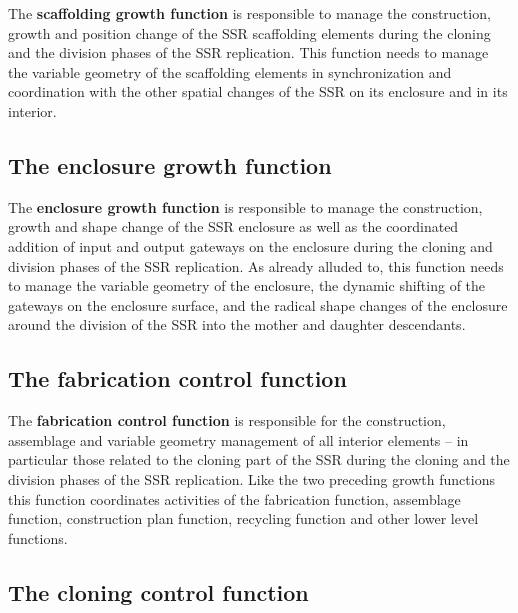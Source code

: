 \hypertarget{RefHeading3094306210128}{}The \textbf{scaffolding growth
function} is responsible to manage the construction, growth and
position change of the SSR scaffolding elements during the cloning and
the division phases of the SSR replication. This function needs to
manage the variable geometry of the scaffolding elements in
synchronization and coordination with the other spatial changes of the
SSR on its enclosure and in its interior.

\subsection[The enclosure growth function]{The enclosure growth
function}

\hypertarget{RefHeading3096306210128}{}The \textbf{enclosure growth
function} is responsible to manage the construction, growth and shape
change of the SSR enclosure as well as the coordinated addition of
input and output gateways on the enclosure during the cloning and
division phases of the SSR replication. As already alluded to, this
function needs to manage the variable geometry of the enclosure, the
dynamic shifting of the gateways on the enclosure surface, and the
radical shape changes of the enclosure around the division of the SSR
into the mother and daughter descendants.

\subsection[The fabrication control function]{The fabrication control
function}

\hypertarget{RefHeading3098306210128}{}The \textbf{fabrication control
function} is responsible for the construction, assemblage and variable
geometry management of all interior elements – in particular those
related to the cloning part of the SSR during the cloning and the
division phases of the SSR replication.  Like the two preceding growth
functions this function coordinates activities of the fabrication
function, assemblage function, construction plan function, recycling
function and other lower level functions. 

\subsection[The cloning control function]{The cloning control function}

